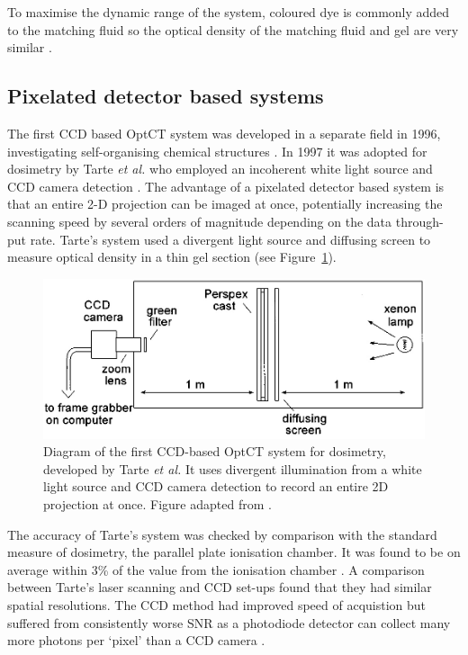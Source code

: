 To maximise the dynamic range of the system, coloured dye is commonly added to the matching fluid so the optical density of the matching fluid and gel are very similar \cite{Krstajic:2006kna}. 




\subsection{Pixelated detector based systems}

The first CCD based OptCT system was developed in a separate field in 1996, investigating self-organising chemical structures \cite{Winfree:1996}.
In 1997 it was adopted for dosimetry by Tarte \textit{et al.} who employed an incoherent white light source and CCD camera detection \cite{Tarte:2007}. The advantage  of a pixelated detector based system  is that an entire 2-D projection can be imaged at once, potentially increasing the scanning speed by several  orders of magnitude depending on the data through-put rate. Tarte's system used a divergent light source and diffusing screen to measure optical density in a thin gel section (see Figure~\ref{fig:tarte_ccd_setup}). 

\begin{figure}[H]
\centering
\includegraphics[scale=0.4]{Tarte_1997_ccdsetup.jpg}
\caption{Diagram of the first CCD-based  OptCT system for dosimetry, developed by Tarte \textit{et al.} It uses  divergent illumination from a white light source and CCD camera detection to record an entire 2D projection at once.   Figure adapted from \cite{Tarte:2007}. }
\label{fig:tarte_ccd_setup}
\end{figure}


The accuracy of Tarte's system  was checked by comparison with the standard measure of dosimetry, the parallel plate ionisation chamber. It was found to be on average within 3\% of the value from the ionisation chamber \cite{Tarte:2007}. A comparison between Tarte's laser scanning and CCD set-ups found that they had similar spatial resolutions. The CCD method had improved speed of acquistion but suffered from consistently worse SNR as a photodiode detector can collect many more photons per `pixel' than a CCD camera \cite{Tarte:2007}.

